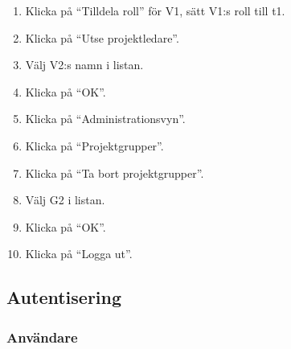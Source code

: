\documentclass[a4paper]{article}
\begin{document}
\begin{ST}
\begin{enumerate}
\item Klicka på ``Tilldela roll'' för V1, sätt V1:s roll till t1.
\item Klicka på ``Utse projektledare''.
\item Välj V2:s namn i listan.
\item Klicka på ``OK''.
\item Klicka på ``Administrationsvyn''.
\item Klicka på ``Projektgrupper''.
\item Klicka på ``Ta bort projektgrupper''.
\item Välj G2 i listan.
\item Klicka på ``OK''.
\item Klicka på ``Logga ut''. 
\end{enumerate}
\end{ST}




\subsection{Autentisering}

\subsubsection{Användare}
\end{document}
